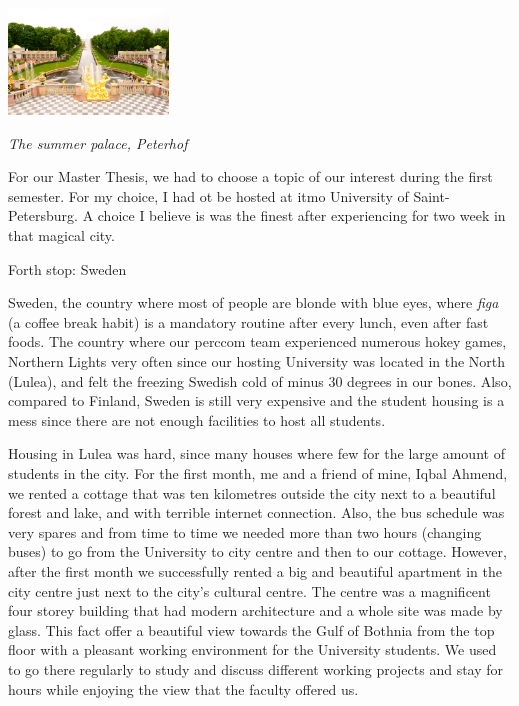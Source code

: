 \documentclass[10pt,a4paper]{article} %
\newcommand{\NewsItem}[1]{ %
\usefont{T1}{fvs}{n}{n} %
\vspace{24pt}\large #1\vspace{3pt} %
\par \normalsize \normalfont}
\begin{document}
\begin{multicols}{3}
 
\begin{center}
	\includegraphics[width=0.32\textwidth]{media/petergof.jpg}
	\par\textit{The summer palace, Peterhof}
\end{center}


For our Master Thesis, we had to choose a topic of our interest during the first 
semester. 
For my choice, I had ot be hosted at {\sc itmo} University of Saint-Petersburg. 
A choice I believe is was the finest after experiencing for two week in that 
magical city.


\NewsItem{Forth stop: Sweden}

Sweden, the country where most of people are blonde with blue eyes, 
where \textit{figa} (a coffee break habit) is a mandatory routine 
after every lunch, even after fast foods. 
The country where our {\sc perccom} team experienced numerous hokey games, Northern 
Lights very often since our hosting University was located in the North (Lulea), and 
felt the freezing Swedish cold of minus 30 degrees in our bones. 
Also, compared to Finland, Sweden is still very expensive and the student housing is 
a mess since there are not enough facilities to host all students. 


Housing in Lulea was hard, since many houses where few for the large amount of 
students in the city. 
For the first month, me and a friend of mine, Iqbal Ahmend, we rented a cottage 
that was ten kilometres outside the city next to a beautiful forest and lake, and 
with terrible internet connection. 
Also, the bus schedule was very spares and from time to time we needed more than two 
hours (changing buses) to go from the University to city centre and then to our 
cottage. 
However, after the first month we successfully rented a big and beautiful apartment 
in the city centre just next to the city's cultural centre. 
The centre was a magnificent four storey building that had modern architecture and 
a whole site was made by glass. 
This fact offer a beautiful view towards the Gulf of Bothnia from the top floor with 
a pleasant working environment for the University students. 
We used to go there regularly to study and discuss different working projects and 
stay for hours while enjoying the view that the faculty offered us.



\end{multicols}
\end{document}

